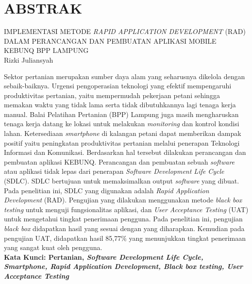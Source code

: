 
\chapter*{ABSTRAK}
\noindent IMPLEMENTASI METODE \textit{RAPID APPLICATION DEVELOPMENT} (RAD) DALAM PERANCANGAN DAN PEMBUATAN APLIKASI MOBILE KEBUNQ BPP LAMPUNG\\
Rizki Juliansyah

\begin{singlespace}
    \begin{justify}
        
    Sektor pertanian merupakan sumber daya alam yang seharusnya dikelola dengan sebaik-baiknya. Urgensi pengoperasian teknologi yang efektif mempengaruhi produktivitas 
    pertanian, yaitu mempermudah pekerjaan petani sehingga memakan waktu yang tidak lama serta tidak dibutuhkannya lagi tenaga kerja manual.
    Balai Pelatihan Pertanian (BPP) Lampung juga masih mengharuskan tenaga kerja datang ke lokasi untuk melakukan \textit{monitoring} 
    dan kontrol kondisi lahan. Ketersediaan \emph{smartphone} di kalangan petani dapat memberikan dampak positif yaitu peningkatan produktivitas pertanian melalui
    penerapan Teknologi Informasi dan Komunikasi. Berdasarkan hal tersebut dilakukan perancangan dan pembuatan aplikasi KEBUNQ. 
    Perancangan dan pembuatan sebuah \emph{software} atau aplikasi tidak lepas dari 
    penerapan \emph{Software Development Life Cycle} (SDLC). SDLC bertujuan untuk memaksimalkan 
    output \emph{software} yang dibuat. Pada penelitian ini, SDLC yang digunakan adalah \emph{Rapid Application Development}
    (RAD). Pengujian yang dilakukan menggunakan metode \emph{black box testing} untuk menguji fungsionalitas aplikasi, dan \emph{User Acceptance Testing} (UAT) untuk mengetahui tingkat penerimaan pengguna. Pada penelitian ini, pengujian \emph{black box} didapatkan hasil yang sesuai dengan yang diharapkan. 
    Kemudian pada pengujian UAT, didapatkan hasil 85,77\% yang menunjukkan tingkat penerimaan yang sangat kuat oleh pengguna.\\[2cm]
        \textbf{Kata Kunci: Pertanian, \textit{Software Development Life Cycle, Smartphone, Rapid Application Development, Black box testing, User Acceptance Testing}}
    \end{justify}

\end{singlespace}

\newpage